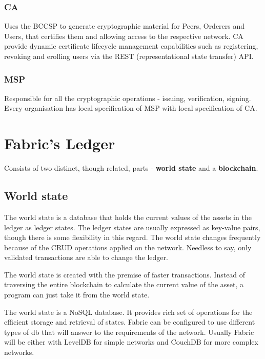 \documentclass[a4paper,11pt]{report}
\begin{document}
 
\subsubsection{CA}

Uses the BCCSP to generate cryptographic material for Peers, Orderers and Users, that certifies them and allowing access to the respective network. CA provide dynamic certificate lifecycle management capabilities such as registering, revoking and erolling users via the REST (representational state transfer) API.\cite{mencias2018optimized}

\subsubsection{MSP}

Responsible for all the cryptographic operations - issuing, verification, signing. Every organisation has local specification of MSP with local specification of CA.

\section{Fabric's Ledger}
\label{fabricLedger}
	Consists of two distinct, though related, parts - \textbf{world state} and  a \textbf{blockchain}.
	
\subsection{World state}
\label{ws}
The world state is a database that holds the current values of the assets in the ledger as ledger states. The ledger states are usually expressed as key-value pairs, though there is some flexibility in this regard. The world state changes frequently because of the CRUD operations applied on the network. Needless to say, only validated transactions are able to change the ledger.

The world state is created with the premise of faster transactions. Instead of traversing the entire blockchain to calculate the current value of the asset, a program can just take it from the world state.

The world state is a NoSQL database. It provides rich set of operations for the efficient storage and retrieval of states. Fabric can be configured to use different types of db that will answer to the requirements of the network. Usually Fabric will be either with LevelDB for simple networks and CouchDB for more complex networks.
\end{document}
